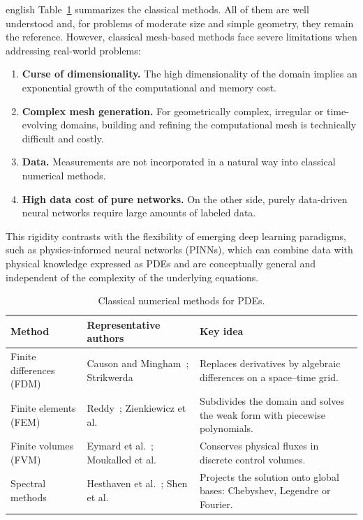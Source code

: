 \begin{hyphenrules}{english}
Table~\ref{tab:classical-methods} summarizes the classical methods. All of them are well understood and,
for problems of moderate size and simple geometry, they remain the reference. However, classical
mesh-based methods face severe limitations when addressing real-world problems:
\begin{enumerate}
  \item \textbf{Curse of dimensionality.} The high dimensionality of the domain implies an exponential
    growth of the computational and memory cost.
  \item \textbf{Complex mesh generation.} For geometrically complex, irregular or time-evolving domains,
    building and refining the computational mesh is technically difficult and costly.
  \item \textbf{Data.} Measurements are not incorporated in a natural way into classical numerical
    methods.
  \item \textbf{High data cost of pure networks.} On the other side, purely data-driven neural
    networks require large amounts of labeled data.
\end{enumerate}
This rigidity contrasts with the flexibility of emerging deep learning paradigms, such as
physics-informed neural networks (PINNs), which can combine data with physical knowledge expressed as
PDEs and are conceptually general and independent of the complexity of the underlying equations.

\begin{table}[htbp]
  \centering
  \caption{Classical numerical methods for PDEs.}
  \label{tab:classical-methods}
  \small
  \begin{tabularx}{\linewidth}{@{}lXX@{}}
    \toprule
    Method & Representative authors & Key idea \\
    \midrule
    Finite differences (FDM) & Causon and Mingham~\cite{causon2010}; Strikwerda~\cite{strikwerda2004} &
      Replaces derivatives by algebraic differences on a space--time grid. \\
    Finite elements (FEM) & Reddy~\cite{reddy2019}; Zienkiewicz et al.~\cite{zienkiewicz2013} &
      Subdivides the domain and solves the weak form with piecewise polynomials. \\
    Finite volumes (FVM) & Eymard et al.~\cite{eymard2000}; Moukalled et al.~\cite{moukalled2016} &
      Conserves physical fluxes in discrete control volumes. \\
    Spectral methods & Hesthaven et al.~\cite{hesthaven2007}; Shen et al.~\cite{shen2011} &
      Projects the solution onto global bases: Chebyshev, Legendre or Fourier. \\
    \bottomrule
  \end{tabularx}
\end{table}


\end{hyphenrules}
